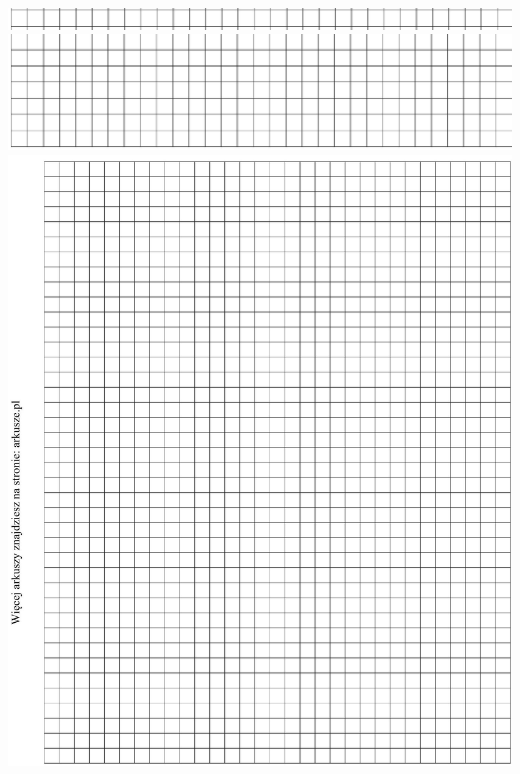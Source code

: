\documentclass[10pt]{article}
\begin{document}
\begin{center}
\begin{tabular}{l|l|l|l|l|l|l|l|l|l|l|l|l|l|l|l|l|l|l|l|l|l|l|l|l|}
 \\
\hline
\end{tabular}
\end{center}

\includegraphics[max width=\textwidth, center]{2024_11_21_f29375993e8c629c464fg-18(3)}\\
\includegraphics[max width=\textwidth, center]{2024_11_21_f29375993e8c629c464fg-18(1)}\\
\includegraphics[max width=\textwidth, center]{2024_11_21_f29375993e8c629c464fg-19}
\end{document}
